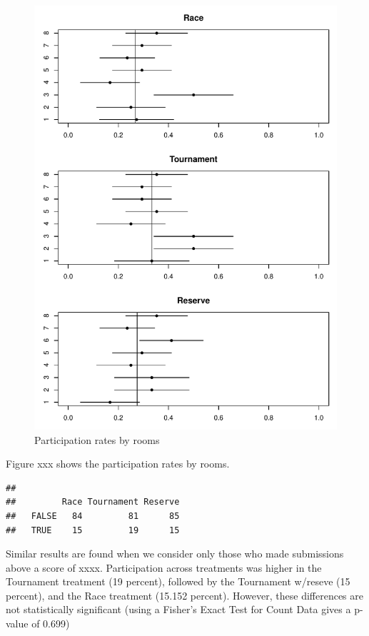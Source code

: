 \documentclass[12pt,]{article}
\begin{document}
\begin{figure}
\centering
\includegraphics{Figures/unnamed-chunk-12-1.pdf}
\caption{Participation rates by rooms}
\end{figure}

Figure xxx shows the participation rates by rooms.

\begin{verbatim}
##        
##         Race Tournament Reserve
##   FALSE   84         81      85
##   TRUE    15         19      15
\end{verbatim}

Similar results are found when we consider only those who made
submissions above a score of xxxx. Participation across treatments was
higher in the Tournament treatment (19 percent), followed by the
Tournament w/reseve (15 percent), and the Race treatment (15.152
percent). However, these differences are not statistically significant
(using a Fisher's Exact Test for Count Data gives a p-value of 0.699)
\end{document}
